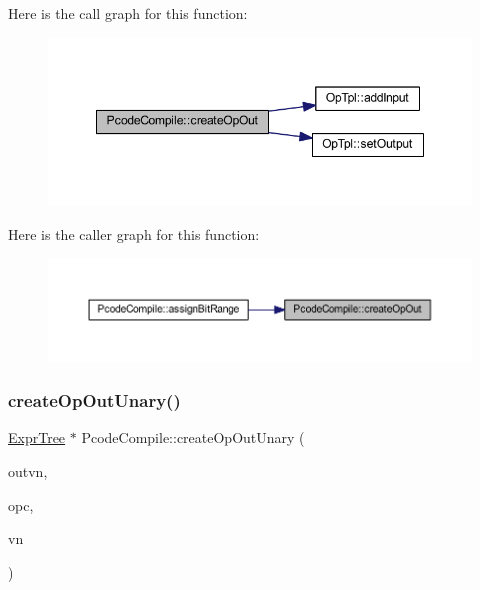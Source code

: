 Here is the call graph for this function\+:
\nopagebreak
\begin{figure}[H]
\begin{center}
\leavevmode
\includegraphics[width=348pt]{class_pcode_compile_ae446c23b3e9630fe67512e572dcfbb73_cgraph}
\end{center}
\end{figure}
Here is the caller graph for this function\+:
\nopagebreak
\begin{figure}[H]
\begin{center}
\leavevmode
\includegraphics[width=350pt]{class_pcode_compile_ae446c23b3e9630fe67512e572dcfbb73_icgraph}
\end{center}
\end{figure}
\mbox{\label{class_pcode_compile_a65b6f2be619a063a46c3727a2de1215d}} 
\subsubsection{\texorpdfstring{createOpOutUnary()}{createOpOutUnary()}}
{\footnotesize\ttfamily \mbox{\hyperlink{class_expr_tree}{Expr\+Tree}} $\ast$ Pcode\+Compile\+::create\+Op\+Out\+Unary (\begin{DoxyParamCaption}\item[{\mbox{\hyperlink{class_varnode_tpl}{Varnode\+Tpl}} $\ast$}]{outvn,  }\item[{\mbox{\hyperlink{opcodes_8hh_abeb7dfb0e9e2b3114e240a405d046ea7}{Op\+Code}}}]{opc,  }\item[{\mbox{\hyperlink{class_expr_tree}{Expr\+Tree}} $\ast$}]{vn }\end{DoxyParamCaption})}



